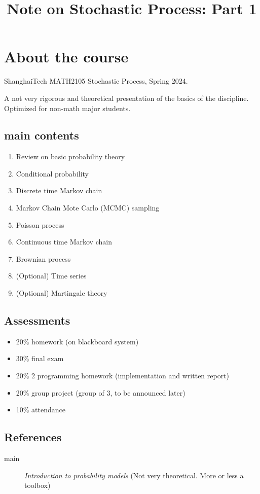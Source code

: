 \documentclass{article}
\title{Note on Stochastic Process: Part 1}
\theoremstyle{definition}
\theoremstyle{remark}
\begin{document}
\section{About the course}

ShanghaiTech MATH2105 Stochastic Process, Spring 2024.

A not very rigorous and theoretical presentation of the basics of the discipline. Optimized for non-math major students.

\subsection{main contents}

\begin{enumerate}
	\item Review on basic probability theory
	\item Conditional probability
	\item Discrete time Markov chain
	\item Markov Chain Mote Carlo (MCMC) sampling
	\item Poisson process
	\item Continuous time Markov chain
	\item Brownian process
	\item (Optional) Time series
	\item (Optional) Martingale theory
\end{enumerate}

\subsection{Assessments}

\begin{itemize}
	\item 20\% homework (on blackboard system)
	\item 30\% final exam
	\item 20\% 2 programming homework (implementation and written report)
	\item 20\% group project (group of 3, to be announced later)
	\item 10\% attendance
\end{itemize}

\subsection{References}

\begin{description}
	\item[main] \emph{Introduction to probability models} (Not very theoretical. More or less a toolbox)
\end{description}
\end{document}
